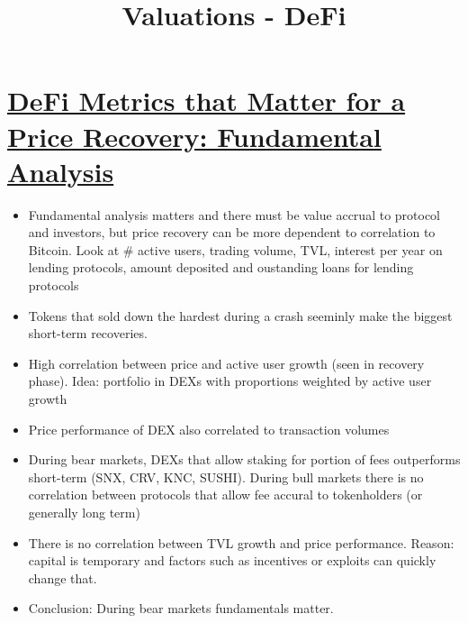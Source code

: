 \documentclass{../../notes}
\title{Valuations - DeFi}
\begin{document}
\maketitle

\section{\href{run:./defi-metrics-that-matter-for-a-price-recovery--fundamental-analysis.pdf}{DeFi Metrics that Matter for a Price Recovery: Fundamental Analysis}}
\begin{itemize}
    \item Fundamental analysis matters and there must be value accrual to protocol and investors, but price recovery can be more dependent to correlation to Bitcoin. Look at \# active users, trading volume, TVL, interest per year on lending protocols, amount deposited and oustanding loans for lending protocols
    \item Tokens that sold down the hardest during a crash seeminly make the biggest short-term recoveries. 
    \item High correlation between price and active user growth (seen in recovery phase). Idea: portfolio in DEXs with proportions weighted by active user growth
    \item Price performance of DEX also correlated to transaction volumes
    \item During bear markets, DEXs that allow staking for portion of fees outperforms short-term (SNX, CRV, KNC, SUSHI). During bull markets there is no correlation between protocols that allow fee accural to tokenholders (or generally long term)
    \item There is no correlation between TVL growth and price performance. Reason: capital is temporary and factors such as incentives or exploits can quickly change that. 
    \item Conclusion: During bear markets fundamentals matter. 
\end{itemize}
\end{document}
